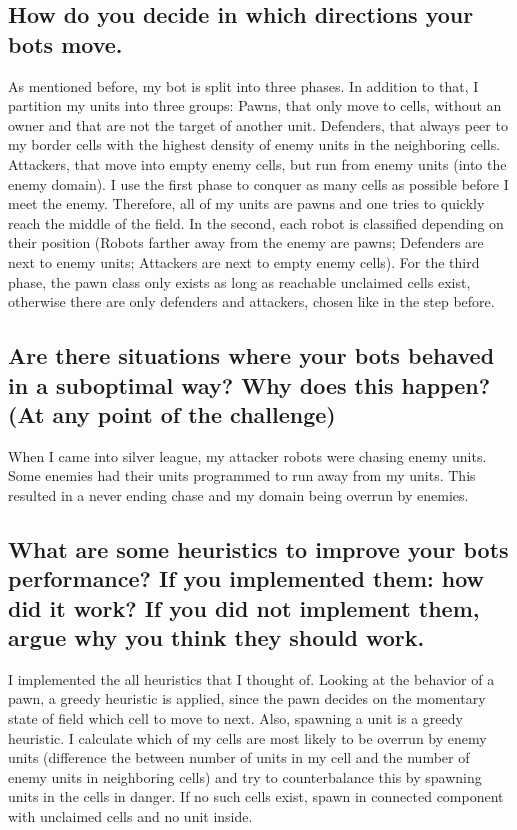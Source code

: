\documentclass[runningheads]{llncs}
\begin{document}
\subsection*{How do you decide in which directions your bots move.}
As mentioned before, my bot is split into three phases. In addition to that, I partition my units into three groups: Pawns, that only move to cells, without an owner and that are not the target of another unit. Defenders, that always
peer to my border cells with the highest density of enemy units in the neighboring cells. Attackers, that move into empty enemy cells, but run from enemy units (into the enemy domain). I use the first phase to conquer as many
cells as possible before I meet the enemy. Therefore, all of my units are pawns and one tries to quickly reach the middle of the field. In the second, each robot is classified depending on their position (Robots farther away from the
enemy are pawns; Defenders are next to enemy units; Attackers are next to empty enemy cells). For the third phase, the pawn class only exists as long as reachable unclaimed cells exist, otherwise there are only defenders and attackers,
chosen like in the step before.

\subsection*{Are there situations where your bots behaved in a suboptimal way? Why does this happen? (At any point of the challenge)}
When I came into silver league, my attacker robots were chasing enemy units. Some enemies had their units programmed to run away from my units. This resulted in a never ending chase and my domain being overrun by enemies.

\subsection*{What are some heuristics to improve your bots performance? If you implemented them: how did it work? If you did not implement them, argue why you think they should work.}
I implemented the all heuristics that I thought of. Looking at the behavior of a pawn, a greedy heuristic is applied, since the pawn decides on the momentary state of field which cell to move to next. Also, spawning a unit is a greedy heuristic.
I calculate which of my cells are most likely to be overrun by enemy units (difference the between number of units in my cell and the number of enemy units in neighboring cells) and try to counterbalance this by spawning units in the cells in danger.
If no such cells exist, spawn in connected component with unclaimed cells and no unit inside.
\end{document}
